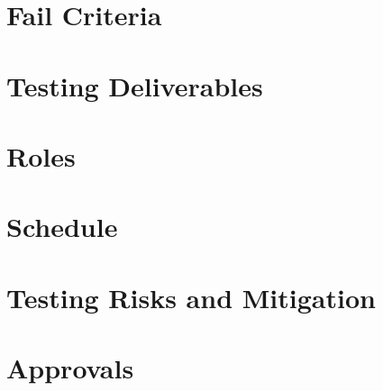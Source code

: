 \documentclass[english,12pt]{article}
\begin{document}
\section{Fail Criteria}

\section{Testing Deliverables}

\section{Roles}

\section{Schedule}

\section{Testing Risks and Mitigation}

\section{Approvals}
\end{document}
